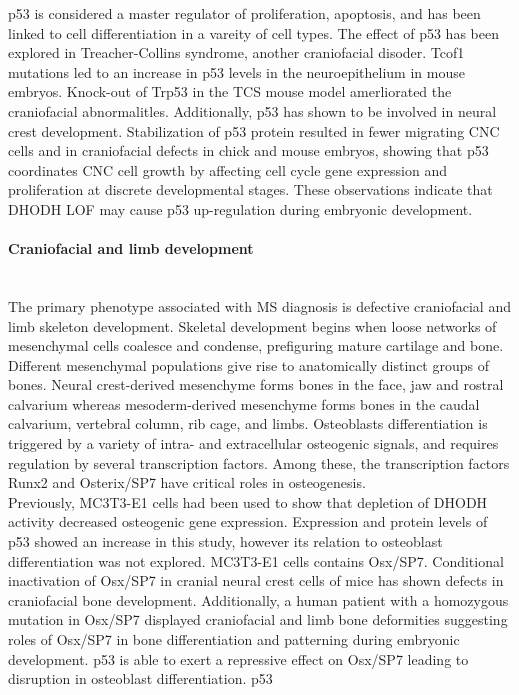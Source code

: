 \documentclass[12pt]{article}
\begin{document}
p53 is considered a master regulator of proliferation, apoptosis, and has been linked to cell differentiation in a vareity of cell types. The effect of p53 has been explored in Treacher-Collins syndrome, another craniofacial disoder. Tcof1 mutations led to an increase in p53 levels in the neuroepithelium in mouse embryos. Knock-out of Trp53 in the TCS mouse model amerliorated the craniofacial abnormalitles. Additionally, p53 has shown to be involved in neural crest development. Stabilization of p53 protein resulted in fewer migrating CNC cells and in craniofacial defects in chick and mouse embryos, showing that p53 coordinates CNC cell growth by affecting cell cycle gene expression and proliferation at discrete developmental stages. These observations indicate that DHODH LOF may cause p53 up-regulation during embryonic development. 



\paragraph{Craniofacial and limb development}
~\\The primary phenotype associated with MS diagnosis is defective craniofacial and limb skeleton development. Skeletal development begins when loose networks of mesenchymal cells coalesce and condense, prefiguring mature cartilage and bone. Different mesenchymal populations give rise to anatomically distinct groups of bones. Neural crest-derived mesenchyme forms bones in the face, jaw and rostral calvarium whereas mesoderm-derived mesenchyme forms bones in the caudal calvarium, vertebral column, rib cage, and limbs. Osteoblasts differentiation is triggered by a variety of intra- and extracellular osteogenic signals, and  requires regulation by several transcription factors. Among these, the transcription factors Runx2 and Osterix/SP7 have critical roles in osteogenesis. 
~\\Previously, MC3T3-E1 cells had been used to show that depletion of DHODH activity decreased osteogenic gene expression. Expression and protein levels of p53 showed an increase in this study, however its relation to osteoblast differentiation was not explored. MC3T3-E1 cells contains Osx/SP7. Conditional inactivation of Osx/SP7 in cranial neural crest cells of mice has shown defects in craniofacial bone development. Additionally, a human patient with a homozygous mutation in Osx/SP7 displayed craniofacial and limb bone deformities suggesting roles of Osx/SP7 in bone differentiation and patterning during embryonic development. p53 is able to exert a repressive effect on Osx/SP7 leading to disruption in osteoblast differentiation. p53 
\end{document}
